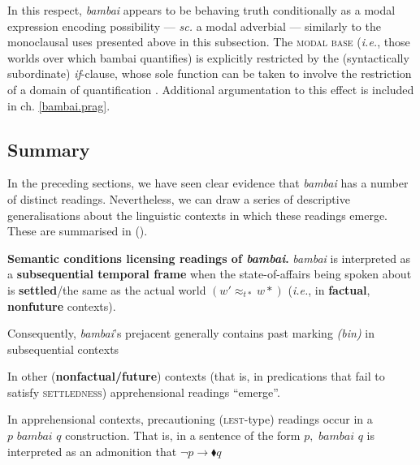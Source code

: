 In this respect, \textit{bambai} appears to be behaving truth conditionally as a modal expression encoding possibility --- \textit{sc.} a modal adverbial --- similarly to the monoclausal uses presented above in this subsection. The \textsc{modal base} (\textit{i.e.}, those worlds over which bambai quantifies) is explicitly restricted by the (syntactically subordinate) \textit{if}-clause, whose sole function can be taken to involve the restriction of a domain of quantification \citep[cf.][]{Kratzer1979,Lewis1975,VonFintel1994,Roberts1989,Roberts1995}. Additional argumentation to this effect is included in ch. \ref{bambai.prag}.



\subsection{Summary}

In the preceding sections, we have seen clear evidence that \textit{bambai} has a number of distinct readings. Nevertheless, we can draw a series of descriptive generalisations about the linguistic contexts in which these readings emerge. These are summarised in (\nextx).%

		\pex[everylabel=\bf\it]\textbf{Semantic conditions licensing readings of \textit{bambai}.}
			\a	\textit{bambai} is interpreted as a \textbf{subsequential temporal frame} when the state-of-affairs being spoken about is \textbf{settled}/the same as the actual world $(w'\approx_{t*} w*)$  (\textit{i.e.}, in \textbf{factual}, \textbf{nonfuture}  contexts).
			
			Consequently, \textit{bambai}'s prejacent generally contains past marking \textit{(bin)} in subsequential contexts
				
			\a	In other (\textbf{nonfactual/future}) contexts (that is, in predications that fail to satisfy \textsc{settledness}) apprehensional readings ``emerge''. 
				
			\a	In apprehensional contexts, precautioning (\textsc{lest}-type) readings occur in a $p \textit{ bambai } q$ construction. That is, in a sentence of the form $p, \textit{ bambai } q$ is interpreted as an admonition that $ \boldsymbol\neg p\to\blacklozenge q $ \xe%
	
